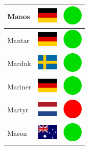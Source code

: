 \documentclass[12pt, a4paper, twoside]{report}
\begin{document}
\begin{center}
\begin{longtable}{|p{5cm}|p{2cm}|p{2cm}|}
 Manos                                                      & \includegraphics[width=1cm]{../4x3/de} &   \includegraphics[width=1cm]{../likes/y} \\ \hline
 Mantar                                                     & \includegraphics[width=1cm]{../4x3/de} &   \includegraphics[width=1cm]{../likes/y} \\ \hline
 Marduk                                                     & \includegraphics[width=1cm]{../4x3/se} &   \includegraphics[width=1cm]{../likes/y} \\ \hline
 Mariner                                                    & \includegraphics[width=1cm]{../4x3/de} &   \includegraphics[width=1cm]{../likes/y} \\ \hline
 Martyr                                                     & \includegraphics[width=1cm]{../4x3/nl} &   \includegraphics[width=1cm]{../likes/n} \\ \hline
 Mason                                                      & \includegraphics[width=1cm]{../4x3/au} &   \includegraphics[width=1cm]{../likes/y} \\ \hline

\end{longtable}
\end{center}
\end{document}
